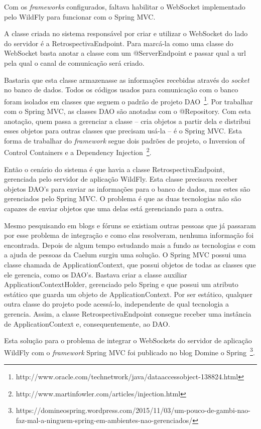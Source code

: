 Com os \textit{frameworks} configurados, faltava habilitar o WebSocket implementado pelo WildFly para funcionar com o Spring MVC.

A classe criada no sistema responsável por criar e utilizar o WebSocket do lado do servidor é a RetrospectivaEndpoint. Para marcá-la como uma classe do WebSocket basta anotar a classe com um @ServerEndpoint e passar qual a url pela qual o canal de comunicação será criado.

Bastaria que esta classe armazenasse as informações recebidas através do \textit{socket} no banco de dados. Todos os códigos usados para comunicação com o banco foram isolados em classes que seguem o padrão de projeto DAO~\footnote{http://www.oracle.com/technetwork/java/dataaccessobject-138824.html}. Por trabalhar com o Spring MVC, as classes DAO são anotadas com o @Repository. Com esta anotação, quem passa a gerenciar a classe -- cria objetos a partir dela e distribui esses objetos para outras classes que precisam usá-la -- é o Spring MVC. Esta forma de trabalhar do \textit{framework} segue dois padrões de projeto, o Inversion of Control Containers e a Dependency Injection~\footnote{http://www.martinfowler.com/articles/injection.html}.

Então o cenário do sistema é que havia a classe RetrospectivaEndpoint, gerenciada pelo servidor de aplicação WildFly. Esta classe precisava receber objetos DAO's para enviar as informações para o banco de dados, mas estes são gerenciados pelo Spring MVC. O problema é que as duas tecnologias não são capazes de enviar objetos que uma delas está gerenciando para a outra.

Mesmo pesquisando em blogs e fóruns se existiam outras pessoas que já passaram por esse problema de integração e como elas resolveram, nenhuma informação foi encontrada. Depois de algum tempo estudando mais a fundo as tecnologias e com a ajuda de pessoas da Caelum surgiu uma solução. O Spring MVC possui uma classe chamada de ApplicationContext, que possui objetos de todas as classes que ele gerencia, como os DAO's. Bastava criar a classe auxiliar ApplicationContextHolder, gerenciado pelo Spring e que possui um atributo estático que guarda um objeto de ApplicationContext. Por ser estático, qualquer outra classe do projeto pode acessá-lo, independente de qual tecnologia a gerencia. Assim, a classe RetrospectivaEndpoint consegue receber uma instância de ApplicationContext e, consequentemente, ao DAO.

Esta solução para o problema de integrar o WebSockets do servidor de aplicação WildFly com o \textit{framework} Spring MVC foi publicado no blog Domine o Spring~\footnote{https://domineospring.wordpress.com/2015/11/03/um-pouco-de-gambi-nao-faz-mal-a-ninguem-spring-em-ambientes-nao-gerenciados/}. 

